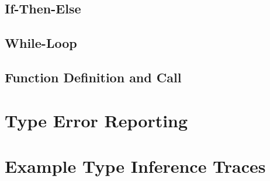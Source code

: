 \subsection{If-Then-Else}

\subsection{While-Loop}

\subsection{Function Definition and Call}

\section{Type Error Reporting}

\section{Example Type Inference Traces}
